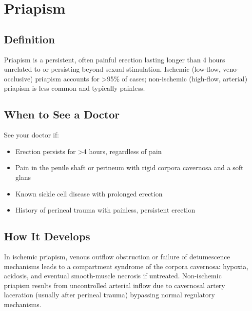 \chapter{Priapism}

\section*{Definition}
Priapism is a persistent, often painful erection lasting longer than 4 hours unrelated to or persisting beyond sexual stimulation. Ischemic (low-flow, veno-occlusive) priapism accounts for \textgreater{}95\% of cases; non-ischemic (high-flow, arterial) priapism is less common and typically painless.

\section*{When to See a Doctor}
See your doctor if:
\begin{itemize}
  \item Erection persists for \textgreater{}4 hours, regardless of pain
  \item Pain in the penile shaft or perineum with rigid corpora cavernosa and a soft glans
  \item Known sickle cell disease with prolonged erection
  \item History of perineal trauma with painless, persistent erection
\end{itemize}

\section*{How It Develops}
In ischemic priapism, venous outflow obstruction or failure of detumescence mechanisms leads to a compartment syndrome of the corpora cavernosa: hypoxia, acidosis, and eventual smooth-muscle necrosis if untreated. Non-ischemic priapism results from uncontrolled arterial inflow due to cavernosal artery laceration (usually after perineal trauma) bypassing normal regulatory mechanisms.

